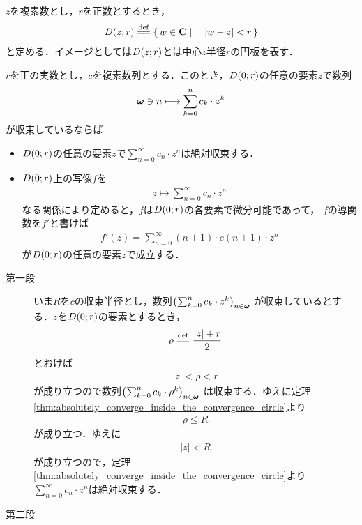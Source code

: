 	$z$を複素数とし，$r$を正数とするとき，
	\begin{align}
		\disc{z}{r} \defeq \Set{w \in \C}{|w - z| < r}
		\label{definition_of_disc_on_plane}
	\end{align}
	と定める．イメージとしては$D(z;r)$とは中心$z$半径$r$の円板を表す．
	
	\begin{screen}
		\begin{thm}[級数で表される関数は微分可能]
		\label{thm:series_expanded_then_differentiable}
			$r$を正の実数とし，$c$を複素数列とする．このとき，$D(0;r)$の任意の要素$z$で数列
			\begin{align}
				{\boldsymbol \omega} \ni n \longmapsto \sum_{k=0}^{n} c_{k} \cdot z^{k}
			\end{align}
			が収束しているならば
			\begin{itemize}
				\item $D(0;r)$の任意の要素$z$で$\sum_{n=0}^{\infty} c_{n} \cdot z^{n}$は絶対収束する．
				\item $D(0;r)$上の写像$f$を
					\begin{align}
						z \longmapsto \sum_{n=0}^{\infty} c_{n} \cdot z^{n}
					\end{align}
					なる関係により定めると，$f$は$D(0;r)$の各要素で微分可能であって，
					$f$の導関数を$f'$と書けば
					\begin{align}
						f'(z) = \sum_{n=0}^{\infty} (n+1) \cdot c(n+1) \cdot z^{n}
					\end{align}
					が$D(0;r)$の任意の要素$z$で成立する．
			\end{itemize}
		\end{thm}
	\end{screen}
	
	\begin{sketch}\mbox{}
		\begin{description}
			\item[第一段]
				いま$R$を$c$の収束半径とし，数列$\left(\sum_{k=0}^{n} c_{k} \cdot z^{k}\right)_{n \in {\boldsymbol \omega}}$
				が収束しているとする．$z$を$D(0;r)$の要素とするとき，
				\begin{align}
					\rho \defeq \frac{|z| + r}{2}
				\end{align}
				とおけば
				\begin{align}
					|z| < \rho < r
				\end{align}
				が成り立つので数列$\left(\sum_{k=0}^{n} c_{k} \cdot \rho^{k}\right)_{n \in {\boldsymbol \omega}}$
				は収束する．ゆえに定理\ref{thm:absolutely_converge_inside_the_convergence_circle}より
				\begin{align}
					\rho \leq R
				\end{align}
				が成り立つ．ゆえに
				\begin{align}
					|z| < R
				\end{align}
				が成り立つので，定理\ref{thm:absolutely_converge_inside_the_convergence_circle}より
				$\sum_{n=0}^{\infty} c_{n} \cdot z^{n}$は絶対収束する．
			
			\item[第二段]
				\QED
		\end{description}
	\end{sketch}
	
